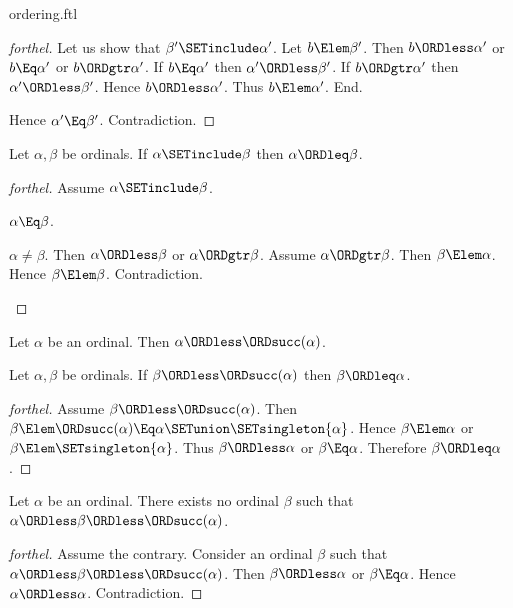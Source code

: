 \documentclass{stex}
\begin{document}
\begin{smodule}{ordering.ftl}
\begin{proof}[forthel]
  Let us show that $\beta' \SETinclude \alpha'$.
    Let $b \Elem \beta'$.
    Then $b \ORDless \alpha'$ or $b \Eq \alpha'$ or $b \ORDgtr \alpha'$.
    If $b \Eq \alpha'$ then $\alpha' \ORDless \beta'$.
    If $b \ORDgtr \alpha'$ then $\alpha' \ORDless \beta'$.
    Hence $b \ORDless \alpha'$.
    Thus $b \Elem \alpha'$.
  End.

  Hence $\alpha' \Eq \beta'$.
  Contradiction.
\end{proof}

\begin{proposition}[forthel,id=SET_THEORY_02_610496856195072]
  Let $\alpha, \beta$ be ordinals.
  If $\alpha \SETinclude \beta$ then $\alpha \ORDleq \beta$.
\end{proposition}
\begin{proof}[forthel]
  Assume $\alpha \SETinclude \beta$.

  \begin{case}{$\alpha \Eq \beta$.} \end{case}

  \begin{case}{$\alpha \neq \beta$.}
    Then $\alpha \ORDless \beta$ or $\alpha \ORDgtr \beta$.
    Assume $\alpha \ORDgtr \beta$.
    Then $\beta \Elem \alpha$.
    Hence $\beta \Elem \beta$.
    Contradiction.
  \end{case}
\end{proof}

\begin{proposition}[forthel,id=SET_THEORY_02_5689190964527104]
  Let $\alpha$ be an ordinal.
  Then $\alpha \ORDless \ORDsucc(\alpha)$.
\end{proposition}

\begin{proposition}[forthel,id=SET_THEORY_02_4064972025888768]
  Let $\alpha, \beta$ be ordinals.
  If $\beta \ORDless \ORDsucc(\alpha)$ then $\beta \ORDleq \alpha$.
\end{proposition}
\begin{proof}[forthel]
  Assume $\beta \ORDless \ORDsucc(\alpha)$.
  Then $\beta \Elem \ORDsucc(\alpha) \Eq \alpha \SETunion \SETsingleton{\alpha}$.
  Hence $\beta \Elem \alpha$ or $\beta \Elem \SETsingleton{\alpha}$.
  Thus $\beta \ORDless \alpha$ or $\beta \Eq \alpha$.
  Therefore $\beta \ORDleq \alpha$.
\end{proof}

\begin{proposition}[forthel,id=SET_THEORY_02_8242798790705152]
  Let $\alpha$ be an ordinal.
  There exists no ordinal $\beta$ such that $\alpha \ORDless \beta \ORDless \ORDsucc(\alpha)$.
\end{proposition}
\begin{proof}[forthel]
  Assume the contrary.
  Consider an ordinal $\beta$ such that $\alpha \ORDless \beta \ORDless \ORDsucc(\alpha)$.
  Then $\beta \ORDless \alpha$ or $\beta \Eq \alpha$.
  Hence $\alpha \ORDless \alpha$.
  Contradiction.
\end{proof}


\end{smodule}
\end{document}
